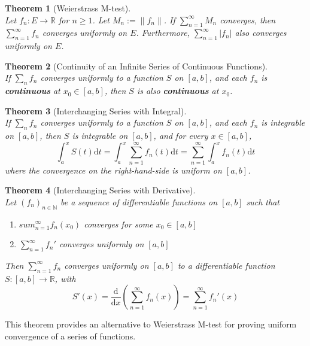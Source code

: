 \documentclass[12pt]{article}
\newcommand{\diff}{\mathrm{d}}
\newtheorem{theorem}{Theorem}[section]
\theoremstyle{definition}
\begin{document}
\begin{theorem}[Weierstrass M-test]
\hfill\\\normalfont Let $f_n:E\to\mathbb{R}$ for $n\geq 1$. Let $M_n:=\|f_n\|$. If $\sum_{n=1}^\infty M_n$ converges, then $\sum_{n=1}^\infty f_n$ converges uniformly on $E$. Furthermore, $\sum_{n=1}^\infty |f_n|$ also converges uniformly on $E$.
\end{theorem}
\begin{theorem}[Continuity of an Infinite Series of Continuous Functions]
\hfill\\\normalfont If $\sum_{n}f_n$ converges uniformly to a function $S$ on $[a,b]$, and each $f_n$ is \textbf{continuous} at $x_0\in [a,b]$, then $S$ is also \textbf{continuous} at $x_0$.
\end{theorem}
\begin{theorem}[Interchanging Series with Integral]
\hfill\\\normalfont If $\sum_{n}f_n$ converges uniformly to a function $S$ on $[a,b]$, and each $f_n$ is integrable on $[a,b]$, then $S$ is integrable on $[a,b]$, and for every $x\in[a,b]$,
\[
\int_a^xS(t)\diff t = \int_a^x \sum_{n=1}^\infty f_n(t)\diff t = \sum_{n=1}^\infty \int_a^x f_n(t)\diff t
\]
where the convergence on the right-hand-side is uniform on $[a,b]$.
\end{theorem}
\begin{theorem}[Interchanging Series with Derivative]
\hfill\\\normalfont Let $(f_n)_{n\in\mathbb{N}}$ be a sequence of differentiable functions on $[a,b]$ such that
\begin{enumerate}
	\item $sum_{n=1}^\infty f_n(x_0)$ converges for some $x_0\in[a,b]$
	\item $\sum_{n=1}^\infty f_n'$ converges uniformly on $[a,b]$
\end{enumerate}
Then $\sum_{n=1}^\infty f_n$ converges uniformly on $[a,b]$ to a differentiable function $S:[a,b]\to \mathbb{R}$, with
\[
S'(x)=\frac{\diff}{\diff x}(\sum_{n=1}^\infty f_n(x))=\sum_{n=1}^\infty f_n'(x)
\]
\end{theorem}
This theorem provides an alternative to Weierstrass M-test for proving uniform convergence of a series of functions.
\clearpage
\end{document}
